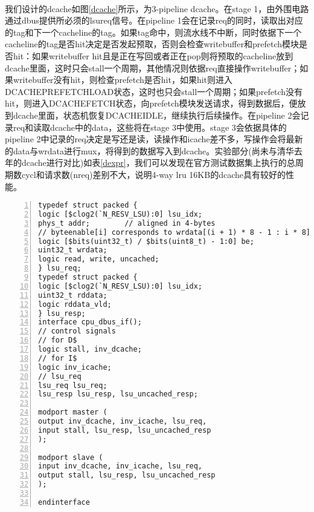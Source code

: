 \documentclass[lang=cn,11pt]{elegantpaper}
\begin{document}
\paragraph{}我们设计的dcache如图\ref{dcache}所示，为3-pipeline dcache。在stage 1，由外围电路通过dbus提供所必须的lsu\underline{\hspace{0.5em}}req信号。在pipeline 1会在记录req的同时，读取出对应的tag和下一个cacheline的tag。如果tag命中，则流水线不中断，同时依据下一个cacheline的tag是否hit决定是否发起预取，否则会检查write\underline{\hspace{0.5em}}buffer和prefetch模块是否hit：如果write\underline{\hspace{0.5em}}buffer hit且是正在写回或者正在pop则将预取的cacheline放到dcache里面，这时只会stall一个周期，其他情况则依据req直接操作write\underline{\hspace{0.5em}}buffer；如果write\underline{\hspace{0.5em}}buffer没有hit，则检查prefetch是否hit，如果hit则进入DCACHE\underline{\hspace{0.5em}}PREFETCH\underline{\hspace{0.5em}}LOAD状态，这时也只会stall一个周期；如果prefetch没有hit，则进入DCACHE\underline{\hspace{0.5em}}FETCH状态，向prefetch模块发送请求，得到数据后，便放到dcache里面，状态机恢复DCACHE\underline{\hspace{0.5em}}IDLE，继续执行后续操作。在pipeline 2会记录req和读取dcache中的data，这些将在stage 3中使用。stage 3会依据具体的pipeline 2中记录的req决定是写还是读，读操作和icache差不多，写操作会将最新的data与wrdata进行mux，将得到的数据写入到dcache。实验部分(尚未与清华去年的dcache进行对比)如表\ref{dexpr}，我们可以发现在官方测试数据集上执行的总周期数cycl和请求数(n\underline{\hspace{0.5em}}req)差别不大，说明4-way lru 16KB的dcache具有较好的性能。
\begin{lstlisting}[language={[ANSI]C},numbers=left,numberstyle=\tiny,%frame=shadowbox,
rulesepcolor=\color{red!20!green!20!blue!20},
keywordstyle=\color{blue!70!black},
commentstyle=\color{blue!90!},
basicstyle=\ttfamily]
typedef struct packed {
logic [$clog2(`N_RESV_LSU):0] lsu_idx;
phys_t addr;		// aligned in 4-bytes
// byteenable[i] corresponds to wrdata[(i + 1) * 8 - 1 : i * 8]
logic [$bits(uint32_t) / $bits(uint8_t) - 1:0] be;
uint32_t wrdata;
logic read, write, uncached;
} lsu_req;
typedef struct packed {
logic [$clog2(`N_RESV_LSU):0] lsu_idx;
uint32_t rddata;
logic rddata_vld;
} lsu_resp;
interface cpu_dbus_if();
// control signals
// for D$
logic stall, inv_dcache;
// for I$
logic inv_icache;
// lsu_req
lsu_req lsu_req;
lsu_resp lsu_resp, lsu_uncached_resp;

modport master (
output inv_dcache, inv_icache, lsu_req,
input stall, lsu_resp, lsu_uncached_resp
);

modport slave (
input inv_dcache, inv_icache, lsu_req,
output stall, lsu_resp, lsu_uncached_resp
);

endinterface
\end{lstlisting}
\end{document}
